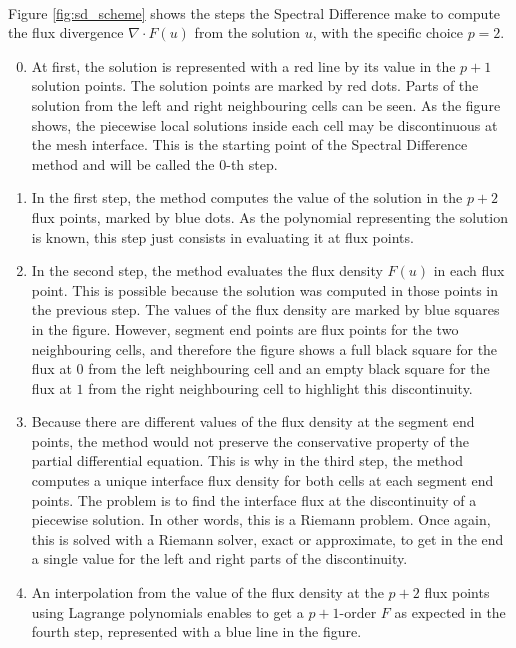       \paragraph{}
      Figure \ref{fig:sd_scheme} shows the steps the Spectral Difference make to compute the flux divergence $\nabla \cdot F\left(u\right)$ from the solution $u$, with the specific choice $p = 2$.
      \begin{enumerate}
        \setcounter{enumi}{-1}
        \item At first, the solution is represented with a red line by its value in the $p + 1$ solution points.
        The solution points are marked by red dots.
        Parts of the solution from the left and right neighbouring cells can be seen.
        As the figure shows, the piecewise local solutions inside each cell may be discontinuous at the mesh interface.
        This is the starting point of the Spectral Difference method and will be called the 0-th step.
        \item In the first step, the method computes the value of the solution in the $p + 2$ flux points, marked by blue dots.
        As the polynomial representing the solution is known, this step just consists in evaluating it at flux points.
        \item In the second step, the method evaluates the flux density $F\left(u\right)$ in each flux point.
        This is possible because the solution was computed in those points in the previous step.
        The values of the flux density are marked by blue squares in the figure.
        However, segment end points are flux points for the two neighbouring cells, and therefore the figure shows a full black square for the flux at $0$ from the left neighbouring cell and an empty black square for the flux at $1$ from the right neighbouring cell to highlight this discontinuity.
        \item Because there are different values of the flux density at the segment end points, the method would not preserve the conservative property of the partial differential equation.
        This is why in the third step, the method computes a unique interface flux density for both cells at each segment end points.
        The problem is to find the interface flux at the discontinuity of a piecewise solution.
        In other words, this is a Riemann problem.
        Once again, this is solved with a Riemann solver, exact or approximate, to get in the end a single value for the left and right parts of the discontinuity.
        \item An interpolation from the value of the flux density at the $p + 2$ flux points using Lagrange polynomials enables to get a $p\!+\!1$-order $F$ as expected in the fourth step, represented with a blue line in the figure.

\end{enumerate}

